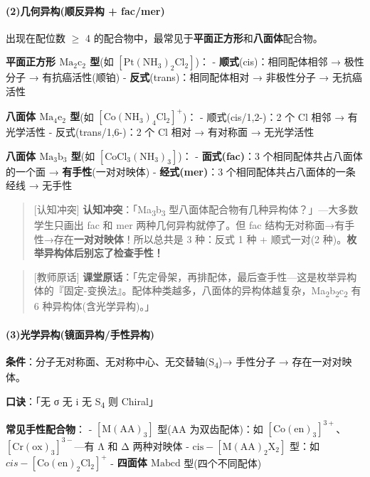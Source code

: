 \paragraph{(2)几何异构(顺反异构 + fac/mer)}\label{ux51e0ux4f55ux5f02ux6784ux987aux53cdux5f02ux6784-facmer}

出现在配位数 \(\geq\) 4 的配合物中，最常见于\textbf{平面正方形}和\textbf{八面体}配合物。

\textbf{平面正方形 \(\mathrm{Ma_2c_2}\) 型}(如 \([\mathrm{Pt(NH_3)_2Cl_2}]\))：
- \textbf{顺式}(cis)：相同配体相邻 → 极性分子 → 有抗癌活性(顺铂)
- \textbf{反式}(trans)：相同配体相对 → 非极性分子 → 无抗癌活性

\textbf{八面体 \(\mathrm{Ma_4e_2}\) 型}(如 \([\mathrm{Co(NH_3)_4Cl_2}]^+\))：
- 顺式(cis/1,2-)：2 个 Cl 相邻 → 有光学活性
- 反式(trans/1,6-)：2 个 Cl 相对 → 有对称面 → 无光学活性

\textbf{八面体 \(\mathrm{Ma_3b_3}\) 型}(如 \([\mathrm{CoCl_3(NH_3)_3}]\))：
- \textbf{面式(fac)}：3 个相同配体共占八面体的一个面 → \textbf{有手性}(一对对映体)
- \textbf{经式(mer)}：3 个相同配体共占八面体的一条经线 → 无手性

\begin{quote}
{[}认知冲突{]} \textbf{认知冲突}：「Ma\textsubscript{3}b\textsubscript{3} 型八面体配合物有几种异构体？」---大多数学生只画出 fac 和 mer 两种几何异构就停了。但 fac 结构无对称面→有手性→存在\textbf{一对对映体}！所以总共是 3 种：反式 1 种 + 顺式一对(2 种)。\textbf{枚举异构体后别忘了检查手性！}
\end{quote}

\begin{quote}
{[}教师原话{]} \textbf{课堂原话}：「先定骨架，再排配体，最后查手性---这是枚举异构体的『固定-变换法』。配体种类越多，八面体的异构体越复杂，Ma\textsubscript{2}b\textsubscript{2}c\textsubscript{2} 有 6 种异构体(含光学异构)。」
\end{quote}

\paragraph{(3)光学异构(镜面异构/手性异构)}\label{ux5149ux5b66ux5f02ux6784ux955cux9762ux5f02ux6784ux624bux6027ux5f02ux6784}

\textbf{条件}：分子无对称面、无对称中心、无交替轴(S\textsubscript{4})→ 手性分子 → 存在一对对映体。

\textbf{口诀}：「无 σ 无 i 无 S\textsubscript{4} 则 Chiral」

\textbf{常见手性配合物}：
- \(\mathrm{[M(AA)_3]}\) 型(AA 为双齿配体)：如 \([\mathrm{Co(en)_3}]^{3+}\)、\([\mathrm{Cr(ox)_3}]^{3-}\)---有 Λ 和 Δ 两种对映体
- \(\mathrm{cis-[M(AA)_2X_2]}\) 型：如 \(cis-[\mathrm{Co(en)_2Cl_2}]^+\)
- \textbf{四面体 \(\mathrm{Mabcd}\)} 型(四个不同配体)

